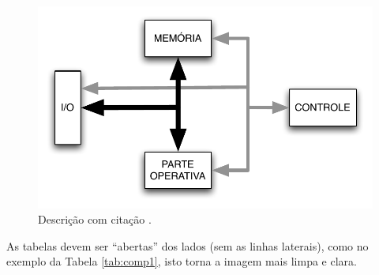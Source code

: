 \begin{figure} %
    \label{fig:dsp}
\end{figure}

\begin{figure}
    \caption[Descrição com citação]{Descrição com citação \cite{artigo}.}
    \centerline{\includegraphics[width=40em]{figuras/dsp}}
    \label{fig:dsp2}
\end{figure}

As tabelas devem ser ``abertas'' dos lados (sem as linhas laterais), como no exemplo da Tabela \ref{tab:comp1}, isto torna a imagem mais limpa e clara.

